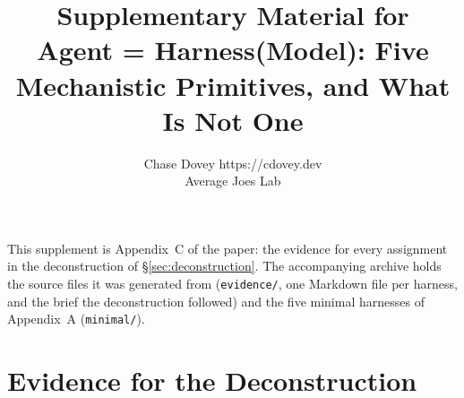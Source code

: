 \documentclass[10pt]{article}
\title{Supplementary Material for\\Agent = Harness(Model): Five Mechanistic Primitives, and What Is Not One}
\author{\name Chase Dovey \email https://cdovey.dev\\\addr Average Joes Lab}
\begin{document}
\maketitle
\noindent This supplement is Appendix~C of the paper: the evidence for every assignment in the deconstruction of \S\ref{sec:deconstruction}. The accompanying archive holds the source files it was generated from (\texttt{evidence/}, one Markdown file per harness, and the brief the deconstruction followed) and the five minimal harnesses of Appendix~A (\texttt{minimal/}).

\appendix
\setcounter{section}{2}
\section{Evidence for the Deconstruction}
\begingroup\footnotesize\sloppy

\endgroup
\end{document}

